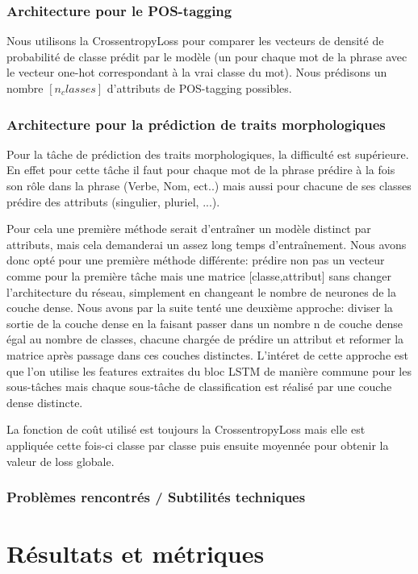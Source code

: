\documentclass[a4paper]{article}
\begin{document}
\subsubsection{Architecture pour le POS-tagging}
Nous utilisons la CrossentropyLoss pour comparer les vecteurs de densité de probabilité de classe prédit par 
le modèle (un pour chaque mot de la phrase avec le vecteur one-hot correspondant à la vrai classe du mot).
Nous prédisons un nombre $[n_classes]$ d'attributs de POS-tagging possibles. 

\subsubsection{Architecture pour la prédiction de traits morphologiques}
Pour la tâche de prédiction des traits morphologiques, la difficulté est supérieure. En effet pour cette tâche 
il faut pour chaque mot de la phrase prédire à la fois son rôle dans la phrase (Verbe, Nom, ect..) mais aussi 
pour chacune de ses classes prédire des attributs (singulier, pluriel, ...).

Pour cela une première méthode serait d'entraîner un modèle distinct par attributs, mais cela demanderai un 
assez long temps d'entraînement. Nous avons donc opté pour une première méthode différente: prédire non pas un 
vecteur comme pour la première tâche mais une matrice [classe,attribut] sans changer l'architecture du réseau, 
simplement en changeant le nombre de neurones de la couche dense. Nous avons par la suite tenté une deuxième 
approche: diviser la sortie de la couche dense en la faisant passer dans un nombre n de couche dense égal au 
nombre de classes, chacune chargée de prédire un attribut et reformer la matrice après passage dans ces couches 
distinctes. L'intéret de cette approche est que l'on utilise les features extraites du bloc LSTM de manière 
commune pour les sous-tâches mais chaque sous-tâche de classification est réalisé par une couche dense distincte.

La fonction de coût utilisé est toujours la CrossentropyLoss mais elle est appliquée cette fois-ci classe par 
classe puis ensuite moyennée pour obtenir la valeur de loss globale.

\subsubsection{Problèmes rencontrés / Subtilités techniques}



\section{Résultats et métriques}
\end{document}
